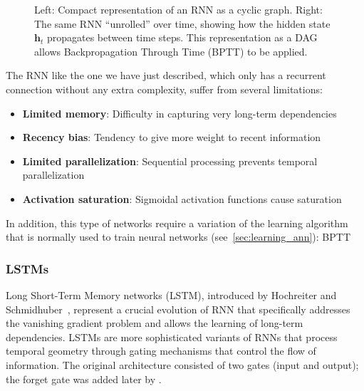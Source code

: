 \begin{figure}[h]
\caption[Compact vs time-unrolled RNN]{Left: Compact representation of an RNN as a cyclic graph. Right: The same RNN ``unrolled'' over time, showing how the hidden state $\mathbf{h}_t$ propagates between time steps. This representation as a DAG allows Backpropagation Through Time (BPTT) to be applied.}
\label{fig:rnn_unrolled}
\end{figure}

The \gls{RNN} like the one we have just described, which only has a recurrent connection without any extra complexity, suffer from several limitations:
\begin{itemize}
	\item \textbf{Limited memory}: Difficulty in capturing very long-term dependencies
	\item \textbf{Recency bias}: Tendency to give more weight to recent information
	\item \textbf{Limited parallelization}: Sequential processing prevents temporal parallelization
	\item \textbf{Activation saturation}: Sigmoidal activation functions cause saturation
\end{itemize}

In addition, this type of networks require a variation of the learning algorithm that is normally used to train neural networks (see~\ref{sec:learning_ann}): \gls{BPTT}~\citep{werbos1990bptt}

\subsubsection{LSTMs}\label{subsubsec:lstm}

Long Short-Term Memory networks (\gls{LSTM}), introduced by Hochreiter and Schmidhuber~\citep{hochreiter1997long}, represent a crucial evolution of \gls{RNN} that specifically addresses the vanishing gradient problem and allows the learning of long-term dependencies. \glspl{LSTM} are more sophisticated variants of \glspl{RNN} that process temporal geometry through gating mechanisms that control the flow of information. The original architecture consisted of two gates (input and output); the forget gate was added later by \citet{gers2000learning}.

